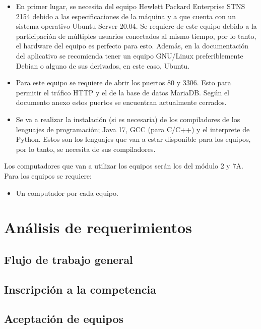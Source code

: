 \documentclass{article}
\begin{document}
\begin{itemize}
  \item En primer lugar, se necesita del equipo Hewlett Packard Enterprise STNS 2154 debido a las especificaciones de la máquina y a que cuenta con un sistema operativo Ubuntu Server 20.04. Se requiere de este equipo debido a la participación de múltiples usuarios conectados al mismo tiempo, por lo tanto, el hardware del equipo es perfecto para esto. Además, en la documentación del aplicativo se recomienda tener un equipo GNU/Linux preferiblemente Debian o alguno de sus derivados, en este caso, Ubuntu.
  \item Para este equipo se requiere de abrir los puertos \(80\) y \(3306\). Esto para permitir el tráfico HTTP y el de la base de datos MariaDB. Según el documento anexo estos puertos se encuentran actualmente cerrados.
  \item Se va a realizar la instalación (si es necesaria) de los compiladores de los lenguajes de programación; Java 17\cite{oracle-java}, GCC\cite{gcc} (para C/C++) y el interprete de Python\cite{python-downloads}. Estos son los lenguajes que van a estar disponible para los equipos, por lo tanto, se necesita de sus compiladores.
\end{itemize}

Los computadores que van a utilizar los equipos serán los del módulo 2 y 7A. Para los equipos se requiere:

\begin{itemize}
  \item Un computador por cada equipo.
\end{itemize}


\section{Análisis de requerimientos}

\subsection{Flujo de trabajo general}

\subsection{Inscripción a la competencia}

\subsection{Aceptación de equipos}
\end{document}
